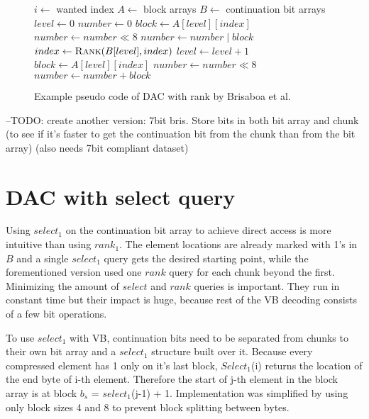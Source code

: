 \begin{figure}[ht]
\centering
\begin{minipage}{0.5\linewidth}
\begin{algorithmic}
\State $i \gets $ wanted index
\State $A \gets $ block arrays
\State $B \gets $ continuation bit arrays
\State $level \gets 0$
\State $number \gets 0$
\State $block \gets A[level][index]$
\State $number \gets number \mathbin{\ll} 8$
\State $number \gets number \mathbin{|} block$
\State $index \gets \Call{Rank}{B[level], index}$
\State $level \gets level + 1$
\EndWhile
\State $block \gets A[level][index]$
\State $number \gets number \mathbin{\ll} 8$
\State $number \gets number + block$
\end{algorithmic}
\end{minipage}
\caption{Example pseudo code of DAC with rank by Brisaboa et al.} \label{bris_pseudo}

\end{figure}

--TODO: create another version: 7bit bris. Store bits in both bit array and chunk (to see if it's faster to get the continuation bit from the chunk than from the bit array) (also needs 7bit compliant dataset)

\chapter{DAC with select query}

Using $select_1$ on the continuation bit array to achieve direct access is more intuitive than using $rank_1$. The element locations are already marked with 1's 
in $B$ and a single $select_1$ query gets the desired starting point, while the forementioned version \citep{Bri09} used one $rank$ query for each chunk beyond 
the first. Minimizing the amount of $select$ and $rank$ queries is important. They run in constant time but their impact is huge, because rest of the VB decoding 
consists of a few bit operations. 

To use $select_1$ with VB, continuation bits need to be separated from chunks to their own bit array and a $select_1$ structure built over it. Because every compressed element has 1
only on it's last block, $Select_1$(i) returns the location of the end byte of i-th element. Therefore the start of j-th element in the block array is at 
block $b_s$ = $select_1$(j-1) + 1. Implementation was simplified by using only block sizes 4 and 8 to prevent block splitting between bytes.

